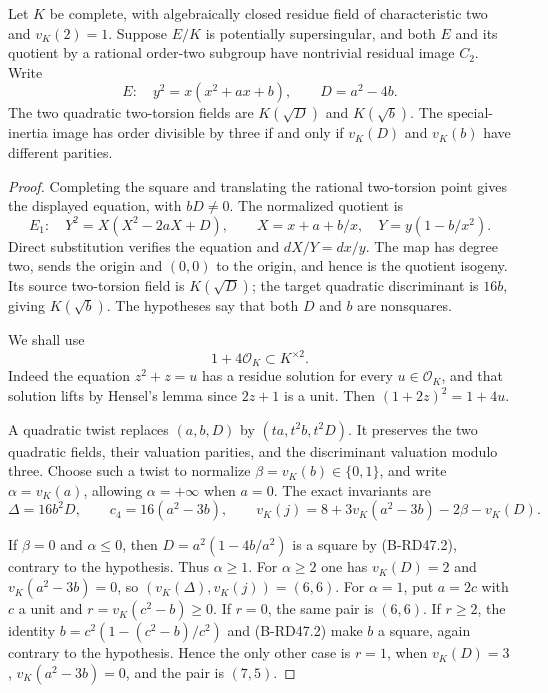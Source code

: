 \begin{lemma}
\label{lem:B-RD47}
Let $K$ be complete, with algebraically closed residue field of
characteristic two and $v_K(2)=1$. Suppose $E/K$ is potentially
supersingular, and both $E$ and its quotient by a rational
order-two subgroup have nontrivial residual image $C_2$.
Write
\[
 E:\quad y^2=x(x^2+a x+b),\qquad D=a^2-4b.
\]
The two quadratic two-torsion fields are $K(\sqrt D)$ and
$K(\sqrt b)$. The special-inertia image has order divisible by
three if and only if $v_K(D)$ and $v_K(b)$ have different parities.
\end{lemma}
\begin{proof}
Completing the square and translating the rational two-torsion
point gives the displayed equation, with $bD\ne0$.
The normalized quotient is
\[
 E_1:\quad Y^2=X(X^2-2aX+D),\qquad
 X=x+a+b/x,\quad Y=y(1-b/x^2).                         \tag{B-RD47.1}
\]
Direct substitution verifies the equation and
$dX/Y=dx/y$. The map has degree two, sends the origin and
$(0,0)$ to the origin, and hence is the quotient isogeny.
Its source two-torsion field is $K(\sqrt D)$; the target
quadratic discriminant is $16b$, giving $K(\sqrt b)$.
The hypotheses say that both $D$ and $b$ are nonsquares.

We shall use
\[
                         1+4\mathcal O_K
                              \subset K^{\times2}.     \tag{B-RD47.2}
\]
Indeed the equation $z^2+z=u$ has a residue solution for every
$u\in\mathcal O_K$, and that solution lifts by Hensel's lemma
since $2z+1$ is a unit. Then $(1+2z)^2=1+4u$.

A quadratic twist replaces $(a,b,D)$ by $(ta,t^2b,t^2D)$.
It preserves the two quadratic fields, their valuation
parities, and the discriminant valuation modulo three.
Choose such a twist to normalize
$\beta=v_K(b)\in\{0,1\}$, and write $\alpha=v_K(a)$,
allowing $\alpha=+\infty$ when $a=0$.
The exact invariants are
\[
 \Delta=16b^2D,\qquad c_4=16(a^2-3b),\qquad
 v_K(j)=8+3v_K(a^2-3b)-2\beta-v_K(D).                 \tag{B-RD47.3}
\]

If $\beta=0$ and $\alpha\le0$, then
$D=a^2(1-4b/a^2)$ is a square by (B-RD47.2), contrary to the
hypothesis. Thus $\alpha\ge1$. For $\alpha\ge2$ one has
$v_K(D)=2$ and $v_K(a^2-3b)=0$, so
$(v_K(\Delta),v_K(j))=(6,6)$.
For $\alpha=1$, put $a=2c$ with $c$ a unit and
$r=v_K(c^2-b)\ge0$.
If $r=0$, the same pair is $(6,6)$.
If $r\ge2$, the identity
$b=c^2(1-(c^2-b)/c^2)$ and (B-RD47.2) make $b$ a square,
again contrary to the hypothesis. Hence the only other case
is $r=1$, when $v_K(D)=3$, $v_K(a^2-3b)=0$, and the pair
is $(7,5)$.


\end{proof}
